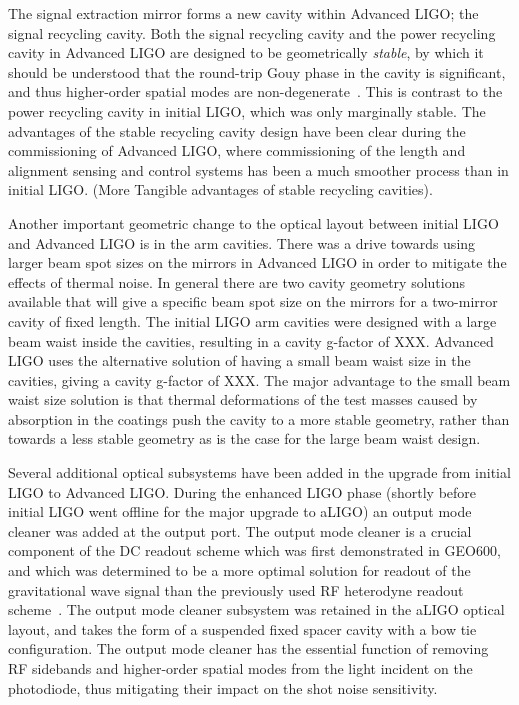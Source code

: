 The signal extraction mirror forms a new cavity within Advanced LIGO; the signal recycling cavity. 
Both the signal recycling cavity and the power recycling cavity in Advanced LIGO are designed to be 
geometrically \emph{stable}, by which it should be understood that the round-trip Gouy phase in the cavity 
is significant, and thus higher-order spatial modes are non-degenerate~\cite{Arain2008}. 
This is contrast to the power recycling cavity in initial LIGO, which was only marginally stable. 
The advantages of the stable recycling cavity design have been clear during the commissioning of 
Advanced LIGO, where commissioning of the length and alignment sensing and control systems has 
been a much smoother process than in initial LIGO. (More Tangible advantages of stable recycling cavities). 

Another important geometric change to the optical layout between initial LIGO and Advanced LIGO is 
in the arm cavities. There was a drive towards using larger beam spot sizes on the mirrors in Advanced 
LIGO in order to mitigate the effects of thermal noise. In general there are two cavity geometry solutions available 
that will give a specific beam spot size on the mirrors for a two-mirror cavity of fixed length. The initial LIGO 
arm cavities were designed with a large beam waist inside the cavities, resulting in a cavity g-factor of XXX. 
Advanced LIGO uses the alternative solution of having a small beam waist size in the cavities, giving a cavity g-factor of XXX. 
The major advantage to the small beam waist size solution is that thermal deformations of the test masses caused by 
absorption in the coatings push the cavity to a more stable geometry, rather than towards a less stable geometry as 
is the case for the large beam waist design. 

Several additional optical subsystems have been added in the upgrade from initial LIGO to Advanced LIGO. 
During the enhanced LIGO phase (shortly before initial LIGO went offline for the major upgrade to aLIGO) an output
mode cleaner was added at the output port. The output mode cleaner is a crucial component of the DC readout 
scheme which was first demonstrated in GEO600, and which was determined to be a more optimal solution for 
readout of the gravitational wave signal than the previously used RF heterodyne readout scheme~\cite{DCreadout}. The output mode 
cleaner subsystem was retained in the aLIGO optical layout, and takes the form of a suspended fixed spacer cavity 
with a bow tie configuration. The output mode cleaner has the essential function of removing RF sidebands and higher-order 
spatial modes from the light incident on the photodiode, thus mitigating their impact on the shot noise sensitivity. 

